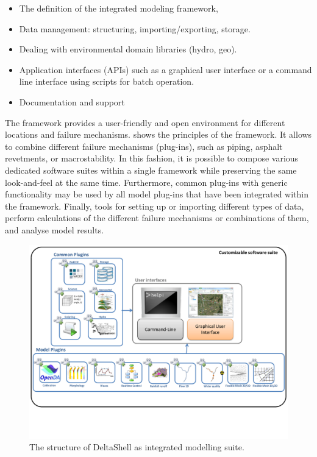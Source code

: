 \begin{itemize}
\item The definition of the integrated modeling framework, 
\item Data management: structuring, importing/exporting, storage.
\item Dealing with environmental domain libraries (hydro, geo).
\item Application interfaces (APIs) such as a graphical user interface or a command line interface using scripts for batch operation.
\item Documentation and support 
\end{itemize}
%
The framework provides a user-friendly and open environment for different locations and failure mechanisms.  shows the principles of the framework. It allows to combine different failure mechanisms (plug-ins), such as piping,  asphalt revetments, or macrostability. In this fashion, it is possible to compose various dedicated software suites within a single framework while preserving the same look-and-feel at the same time. Furthermore, common plug-ins with generic functionality may be used by all model plug-ins that have been integrated within the framework. Finally, tools for setting up or importing different types of data, perform calculations of the different failure mechanisms or combinations of them, and analyse model results.
%
\begin{figure} [H]
	\centering
		\includegraphics[width=\textwidth]{Figures/Chapter_overview/delta_shell_structure}
	\caption{The structure of DeltaShell  as integrated modelling suite.}
	\label{fig:figstructure}
\end{figure}

